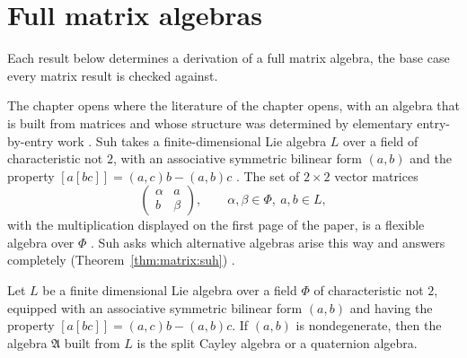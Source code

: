 \section{Full matrix algebras}\label{sec:matrix-triangular:matrix}

Each result below determines a derivation of a full matrix algebra, the base
case every matrix result is checked against. %

The chapter opens where the literature of the chapter opens, with an algebra that is built
from matrices and whose structure was determined by elementary entry-by-entry
work \cite[p.~255]{Suh1969}. Suh takes a finite-dimensional Lie algebra $L$ over a field of
characteristic not $2$, with an associative symmetric bilinear form $(a,b)$ and
the property $[a[bc]]=(a,c)b-(a,b)c$ \cite[p.~255]{Suh1969}. The set of $2\times2$
vector matrices
\[
\begin{pmatrix} \alpha & a \\ b & \beta\end{pmatrix},
\qquad \alpha,\beta\in\Phi,\ a,b\in L,
\]
with the multiplication displayed on the first page of the paper, is a flexible
algebra over $\Phi$ \cite[p.~255]{Suh1969}. Suh asks which alternative algebras
arise this way and answers completely (Theorem~\ref{thm:matrix:suh}) \cite[p.~255]{Suh1969}.

\begin{theorem}\label{thm:matrix:suh}
Let $L$ be a finite dimensional Lie algebra over a field $\Phi$ of
characteristic not $2$, equipped with an associative symmetric bilinear form
$(a,b)$ and having the property $[a[bc]]=(a,c)b-(a,b)c$. If $(a,b)$ is
nondegenerate, then the algebra $\mathfrak{A}$ built from $L$ is the split
Cayley algebra or a quaternion algebra.
\end{theorem}

